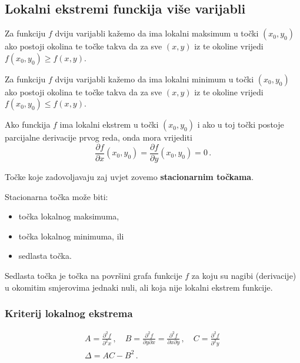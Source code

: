 \subsection{Lokalni ekstremi funckija više varijabli}

\begin{definition}
    Za funkciju $f$ dviju varijabli kažemo da ima lokalni maksimum u točki
    $(x_0, y_0)$ ako postoji okolina te točke takva da za sve $(x,y)$ iz te
    okoline vrijedi $f(x_0,y_0) \geq f(x,y)$.
\end{definition}

\begin{definition}
    Za funkciju $f$ dviju varijabli kažemo da ima lokalni minimum u točki $(x_0,
    y_0)$ ako postoji okolina te točke takva da za sve $(x,y)$ iz te okoline
    vrijedi $f(x_0,y_0) \leq f(x,y)$.
\end{definition}

Ako funckija $f$ ima lokalni ekstrem u točki $(x_0, y_0)$ i ako u toj točki
postoje parcijalne derivacije prvog reda, onda mora vrijediti
$$
\frac{\partial f}{\partial x} (x_0, y_0) = \frac{\partial f}{\partial y} (x_0, y_0) = 0\,.
$$

Točke koje zadovoljavaju zaj uvjet zovemo \textbf{stacionarnim točkama}.

Stacionarna točka može biti:
\begin{itemize}
    \item točka lokalnog maksimuma,
    \item točka lokalnog minimuma, ili
    \item sedlasta točka.
\end{itemize}

\begin{definition}
    Sedlasta točka je točka na površini grafa funkcije $f$ za koju su nagibi
    (derivacije) u okomitim smjerovima jednaki nuli, ali koja nije lokalni
    ekstrem funkcije.
\end{definition}

\subsubsection{Kriterij lokalnog ekstrema}

\begin{gather*}
    A = \frac{\partial^2 f}{\partial^2 x}\,,\quad
    B = \frac{\partial^2 f}{\partial y \partial x} = \frac{\partial^2 f}{\partial x \partial y}\,,\quad
    C = \frac{\partial^2 f}{\partial^2 y}\,\\
    \Delta = AC - B^2\,.
\end{gather*}

